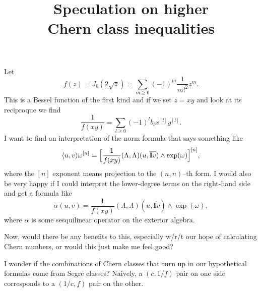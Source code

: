 \documentclass[11pt,a4paper]{amsart}
\title{Speculation on higher\\Chern class inequalities}
\def\^#1{^{[#1]}}
\def\I{\mathbf{I}}
\def\la{\langle}
\def\ra{\rangle}
\theoremstyle{definition}
\theoremstyle{remark}
\numberwithin{equation}{section}
\begin{document}
\maketitle 


Let 
$$
f(z) = J_0(2\sqrt z) = \sum_{m\geq0} (-1)^m \frac{1}{m!^2} z^m.
$$
This is a Bessel function of the first kind and if we set $z = xy$ and look at its reciproque we find
$$
\frac{1}{f(xy)} = \sum_{l\geq 0} (-1)^l b_l x\^l y\^l.
$$
I want to find an interpretation of the norm formula that says something like
$$
\la u,v \ra \omega\^n
= 
\Bigl[
\frac{1}{f(xy)}(\Lambda,\Lambda)(u,\overline{\I v})
\wedge \exp(\omega)
\Bigr]\^n,
$$
where the $[n]$ exponent means projection to the $(n,n)$--th form. I would also be very happy if I could interpret the lower-degree terms on the right-hand side and get a formula like
$$
\alpha(u,v)
= 
\frac{1}{f(xy)}(\Lambda,\Lambda)(u,\overline{\I v})
\wedge \exp(\omega),
$$
where $\alpha$ is some sesquilinear operator on the exterior algebra.

Now, would there be any benefits to this, especially w/r/t our hope of calculating Chern numbers, or would this just make me feel good?

I wonder if the combinations of Chern classes that turn up in our hypothetical formulas come from Segre classes? Naively, a $(c,1/f)$ pair on one side corresponds to a $(1/c,f)$ pair on the other.
\end{document}

